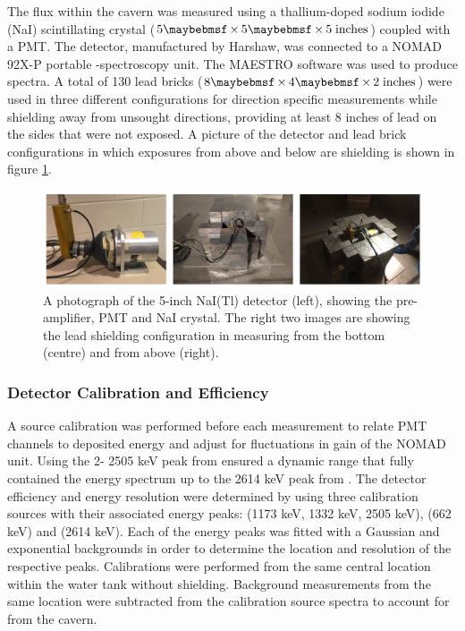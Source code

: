 The \gray{} flux within the cavern was measured using a thallium-doped sodium iodide (NaI) scintillating crystal ($5 \times 5 \times 5 \; \MathText{inches}$) coupled with a PMT. The detector, manufactured by Harshaw, was connected to a NOMAD 92X-P portable \gray{}-spectroscopy unit. The MAESTRO software was used to produce spectra. A total of 130 lead bricks ($8 \times 4 \times 2 \; \MathText{inches}$) were used in three different configurations for direction specific measurements while shielding away \grays{} from unsought directions, providing at least 8 inches of lead on the sides that were not exposed. A picture of the detector and lead brick configurations in which exposures from above and below are shielding is shown in figure \ref{fig:detector_and_shielding}.
%
\begin{figure}[]
    \centering
    \includegraphics[scale=0.75]{Chapter_3/Figures/Davis_detector_shielding.png}
    \caption[Diagram of the NaI(Tl) crystal detector and the lead shielding used in taking direction specific measurements.]
    {A photograph of the 5-inch NaI(Tl) detector (left), showing the pre-amplifier, PMT and NaI crystal. The right two images are showing the lead shielding configuration in measuring \grays{} from the bottom (centre) and from above (right).}
    \label{fig:detector_and_shielding}
\end{figure}
%

\subsubsection{Detector Calibration and Efficiency}
\label{secsec:calibration_efficiency}


A \CoSZ{} source calibration was performed before each measurement to relate PMT channels to deposited energy and adjust for fluctuations in gain of the NOMAD unit.
Using the 2-\gamma{} 2505 keV peak from \CoSZ{} ensured a dynamic range that fully contained the energy spectrum up to the 2614 keV peak from \TlTZE{}. The detector efficiency and energy resolution were determined by using three calibration sources with their associated energy peaks: \CoSZ{} (1173 keV, 1332 keV, 2505 keV), \CsOTS{} (662 keV) and \TlTZE{} (2614 keV). Each of the energy peaks was fitted with a Gaussian and exponential backgrounds in order to determine the location and resolution of the respective peaks. Calibrations were performed from the same central location within the water tank without shielding. Background measurements from the same location were subtracted from the calibration source spectra to account for \grays{} from the cavern. 

